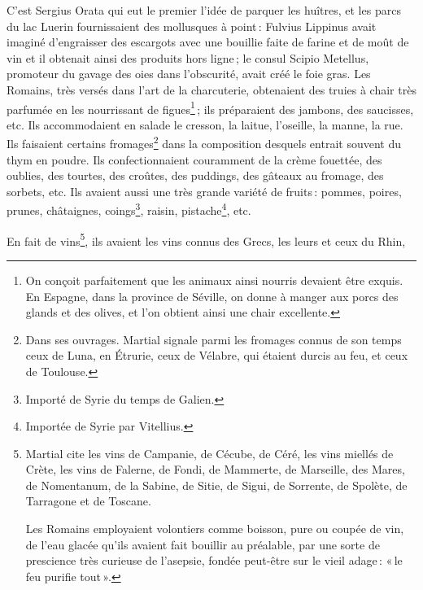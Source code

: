 C'est Sergius Orata qui eut le premier l'idée de parquer les huîtres, et les
parcs du lac Luerin fournissaient des mollusques à point : Fulvius Lippinus
avait imaginé d'engraisser des escargots avec une bouillie faite de farine et
de moût de vin et il obtenait ainsi des produits hors ligne ; le consul Scipio
Metellus, promoteur du gavage des oies dans l'obscurité, avait créé le foie
gras. Les Romains, très versés dans l'art de la charcuterie, obtenaient des
truies à chair très parfumée en les nourrissant de figues\footnote{On conçoit
parfaitement que les animaux ainsi nourris devaient être exquis. En Espagne,
dans la province de Séville, on donne à manger aux porcs des glands et des
olives, et l'on obtient ainsi une chair excellente.} ; ils préparaient des
jambons, des saucisses, etc. Ils accommodaient en salade le cresson, la laitue,
l'oseille, la manne, la rue. Ils faisaient certains fromages\footnote{Dans ses
ouvrages. Martial signale parmi les fromages connus de son temps ceux de Luna,
en Étrurie, ceux de Vélabre, qui étaient durcis au feu, et ceux de Toulouse.}
dans la composition desquels entrait souvent du thym en poudre. Ils
confectionnaient couramment de la crème fouettée, des oublies, des tourtes, des
croûtes, des puddings, des gâteaux au fromage, des sorbets, etc. Ils avaient
aussi une très grande variété de fruits : pommes, poires, prunes, châtaignes,
coings\footnote{Importé de Syrie du temps de Galien.}, raisin,
pistache\footnote{Importée de Syrie par Vitellius.}, etc.

En fait de vins\footnote{ Martial cite les vins de Campanie, de Cécube, de
Céré, les vins miellés de Crète, les vins de Falerne, de Fondi, de Mammerte, de
Marseille, des Mares, de Nomentanum, de la Sabine, de Sitie, de Sigui, de
Sorrente, de Spolète, de Tarragone et de Toscane.

Les Romains employaient volontiers comme boisson, pure ou coupée de vin, de
l'eau glacée qu'ils avaient fait bouillir au préalable, par une sorte de
prescience très curieuse de l’asepsie, fondée peut-être sur le vieil adage :
« le feu purifie tout ».}, ils avaient les vins connus des Grecs, les leurs et
ceux du Rhin,

